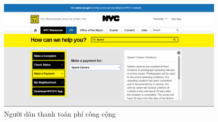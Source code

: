 \documentclass[a4paper]{article}
\begin{document}
\newpage
\begin{center}
    \begin{figure}[h]
    \begin{center}
     \includegraphics[scale=.4]{newyork_payment.PNG}
    \end{center}
    \caption{Người dân thanh toán phí công cộng}
    \label{refhinh2}
    \end{figure}
\end{center}
\end{document}

